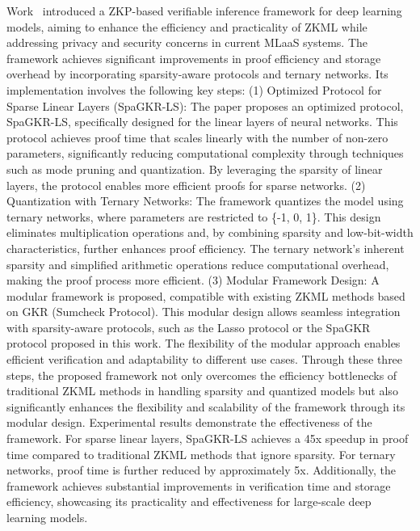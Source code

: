 \documentclass[journal]{IEEEtran}
\begin{document}
Work~\cite{li2024sparsity} introduced a ZKP-based verifiable inference framework for deep learning models, aiming to enhance the efficiency and practicality of ZKML while addressing privacy and security concerns in current MLaaS systems. The framework achieves significant improvements in proof efficiency and storage overhead by incorporating sparsity-aware protocols and ternary networks. Its implementation involves the following key steps: (1) Optimized Protocol for Sparse Linear Layers (SpaGKR-LS): The paper proposes an optimized protocol, SpaGKR-LS, specifically designed for the linear layers of neural networks. This protocol achieves proof time that scales linearly with the number of non-zero parameters, significantly reducing computational complexity through techniques such as mode pruning and quantization. By leveraging the sparsity of linear layers, the protocol enables more efficient proofs for sparse networks. (2) Quantization with Ternary Networks: The framework quantizes the model using ternary networks, where parameters are restricted to \{-1, 0, 1\}. This design eliminates multiplication operations and, by combining sparsity and low-bit-width characteristics, further enhances proof efficiency. The ternary network's inherent sparsity and simplified arithmetic operations reduce computational overhead, making the proof process more efficient. (3) Modular Framework Design: A modular framework is proposed, compatible with existing ZKML methods based on GKR (Sumcheck Protocol). This modular design allows seamless integration with sparsity-aware protocols, such as the Lasso protocol \cite{setty2024unlocking} or the SpaGKR protocol proposed in this work. The flexibility of the modular approach enables efficient verification and adaptability to different use cases. Through these three steps, the proposed framework not only overcomes the efficiency bottlenecks of traditional ZKML methods in handling sparsity and quantized models but also significantly enhances the flexibility and scalability of the framework through its modular design. Experimental results demonstrate the effectiveness of the framework. For sparse linear layers, SpaGKR-LS achieves a 45x speedup in proof time compared to traditional ZKML methods that ignore sparsity. For ternary networks, proof time is further reduced by approximately 5x. Additionally, the framework achieves substantial improvements in verification time and storage efficiency, showcasing its practicality and effectiveness for large-scale deep learning models.
\end{document}
